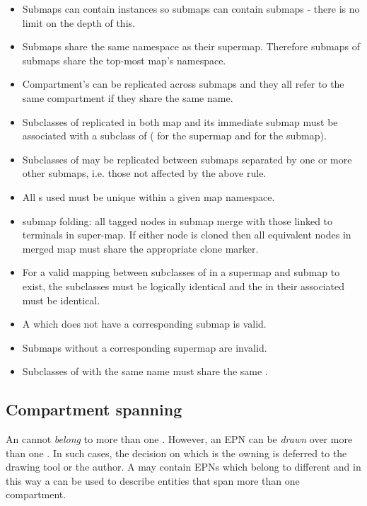 \begin{itemize}
\item Submaps can contain  instances so submaps
  can contain submaps - there is no limit on the depth of this.
\item Submaps share the same namespace as their supermap. Therefore submaps of
  submaps share the top-most map's namespace.
\item Compartment's can be replicated across submaps and they all
  refer to the same compartment if they share the same name.
\item Subclasses of  replicated in both map
  and its immediate submap must be
  associated with a subclass of 
  ( for the supermap and  for
 the submap).
\item Subclasses of  may be replicated
  between submaps separated by one or more other submaps, i.e. those
  not affected by the above rule.
\item All s used must be unique within a given
  map namespace.
\item submap folding: all tagged nodes in submap merge with those
  linked to terminals in super-map. If either node is cloned then all
  equivalent nodes in merged map must share the appropriate clone
  marker.
\item For a valid mapping between subclasses of  in a supermap and submap to
  exist, the  subclasses must be logically
  identical and the  in their associated  must be identical.
\item A  which does not have a corresponding
  submap is valid.
\item Submaps without a corresponding supermap are invalid.
\item Subclasses of  with the same name must
  share the same .
\end{itemize}

\subsection{Compartment spanning}

An  cannot \emph{belong} to more than one
. However, an EPN can be \emph{drawn} over more than one
. In such cases, the decision on which is the owning
 is deferred to the drawing tool or the
author. A  may contain EPNs which belong to different
 and in this way a  can be used to describe
entities that span more than one {compartment}.

